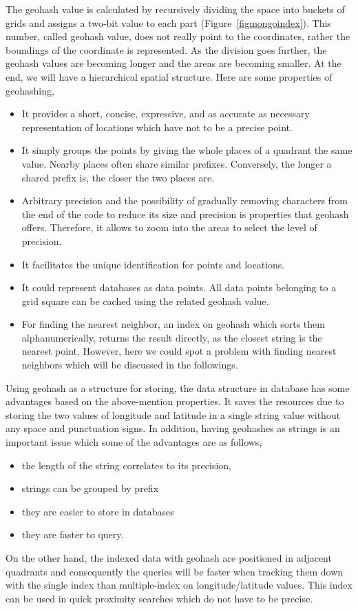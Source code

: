 \documentclass[a4paper,12pt]{article}
\begin{document}
The geohash value is calculated by recursively dividing the space into buckets of grids and assigns a two-bit value to each part (Figure~\ref{figmongoindex}). This number, called geohash value, does not really point to the coordinates, rather the boundings of the coordinate is represented. 
As the division goes further, the geohash values are becoming longer and the areas are becoming smaller. 
At the end, we will have a hierarchical spatial structure. Here are some properties of geohashing,
\begin{itemize}
\item It provides a short, concise, expressive, and as accurate as necessary representation of locations which have not to be a precise point.
\item It simply groups the points by giving the whole places of a quadrant the same value. Nearby places often share similar prefixes. Conversely, the longer a shared prefix is, the closer the two places are. 
\item Arbitrary precision and the possibility of gradually removing characters from the end of the code to reduce its size and precision is properties that geohash offers. Therefore, it allows to zoom into the areas to select the level of precision.
\item It facilitates the unique identification for points and locations.
\item It could represent databases as data points. All data points belonging to a grid square can be cached using the related geohash value.
\item For finding the nearest neighbor, an index on geohash which sorts them alphanumerically, returns the result directly, as the closest string is the nearest point. However, here we could spot a problem with finding nearest neighbors which will be discussed in the followings.
\end{itemize}

Using geohash as a structure for storing, the data structure in database has some advantages based on the above-mention properties. It saves the resources due to storing the two values of longitude and latitude in a single string value without any space and punctuation signs. 
In addition, having geohashes as strings is an important issue which some of the advantages are as follows, 
\begin{itemize}
\item the length of the string correlates to its precision,
\item strings can be grouped by prefix
\item  they are easier to store in databases
\item  they are faster to query. 
\end{itemize}
On the other hand, the indexed data with geohash are positioned in adjacent quadrants and consequently the queries will be faster when tracking them down with the single index than multiple-index on longitude/latitude values. This index can be used in quick proximity searches which do not have to be precise.
\end{document}
